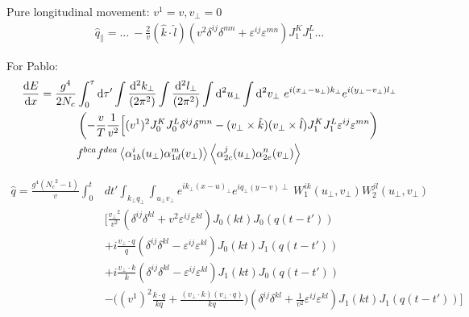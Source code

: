 Pure longitudinal movement: $v^1 = v, v_\perp=0$
\begin{equation*}
\begin{split}
\hat{q}_\parallel = ...~ - \frac{2}{v} (\hat{k} \cdot \hat{l}) \left( v^2 \delta^{ij} \delta^{mn} + \varepsilon^{ij}\varepsilon^{mn} \right)  J_1 ^K J_1^L ...
\end{split}
\end{equation*}

\newpage
For Pablo:
\begin{equation*}
\begin{split}
\frac{\mathop{}\!\mathrm{d} E}{\mathop{}\!\mathrm{d} x} = \frac{g^4}{2 N_c} &
\int_0^\tau \mathop{}\!\mathrm{d} \tau'
\int \frac{\mathop{}\!\mathrm{d}^2 k_\perp}{(2\pi^2)}
\int \frac{\mathop{}\!\mathrm{d}^2 l_\perp}{(2\pi^2)}
\int \mathop{}\!\mathrm{d}^2 u_\perp
\int \mathop{}\!\mathrm{d}^2 v_\perp ~
e^{i (x_\perp - u_\perp) k_\perp}
e^{i (y_\perp - v_\perp) l_\perp} \\
& \left( -\frac{v}{T} \frac{1}{v^2} \Big[ (v^1)^2 J_0^K J_0^L \delta^{ij} \delta^{mn} - (v_\perp \times \hat{k})(v_\perp \times \hat{l}) J_1^K J_1^L  \varepsilon^{ij} \varepsilon^{mn} \right)\\
&  f^{bca} f^{dea}
\left< \alpha^i_{1b} (u_\perp) \alpha^m_{1d} (v_\perp) \right>  \left< \alpha^j_{2c} (u_\perp) \alpha^n_{2e} (v_\perp) \right>
\end{split}
\end{equation*}

\begin{equation*}
\begin{split}
\hat{q} = \frac{g^4 ({N_c}^2-1)}{v}
\int_0^t & d t'
\int_{k_\perp q_\perp}
\int_{u_\perp v_\perp}
e^{i k_\perp (x - u)_\perp }
e^{i q_\perp (y - v)\perp} 
~ W_1^{ik} (u_\perp, v_\perp) W_2^{jl}(u_\perp, v_\perp)\\
& \Bigg[\frac{{v_\perp}^2}{v^2} \left( \delta^{ij} \delta^{kl} + v^2 \varepsilon^{ij} \varepsilon^{kl} \right) J_0(kt) J_0(q(t-t')) \\
& + i \frac{v_\perp \cdot q}{q} (\delta^{ij} \delta^{kl} - \varepsilon^{ij} \varepsilon^{kl}) J_0 (kt) J_1(q (t-t')) \\
& + i \frac{v_\perp \cdot k}{k} (\delta^{ij} \delta^{kl} - \varepsilon^{ij} \varepsilon^{kl}) J_1 (k t) J_0(q (t-t')) \\
& -  \Big( (v^1)^2 \frac{k \cdot q}{kq} +\frac{(v_\perp \cdot k) (v_\perp \cdot q)}{kq} \Big) \left( \delta^{ij} \delta^{kl} + \frac{1}{v^2} \varepsilon^{ij}\varepsilon^{kl} \right)  J_1 (k t) J_1(q (t-t')) \Bigg] \\
\end{split}
\end{equation*}



